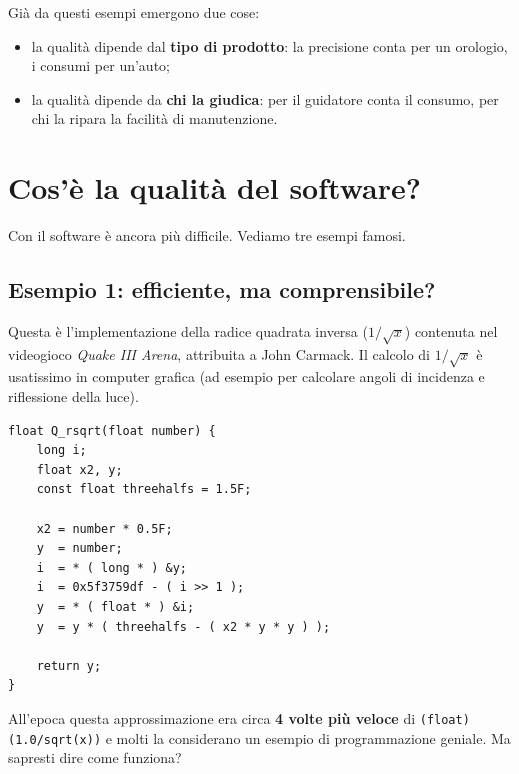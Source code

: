 Già da questi esempi emergono due cose:
\begin{itemize}
  \item la qualità dipende dal \textbf{tipo di prodotto}: la precisione conta per un orologio, i consumi per un'auto;
  \item la qualità dipende da \textbf{chi la giudica}: per il guidatore conta il consumo, per chi la ripara la facilità di manutenzione.
\end{itemize}

\section{Cos'è la qualità del software?}

Con il software è ancora più difficile. Vediamo tre esempi famosi.

\subsection{Esempio 1: efficiente, ma comprensibile?}

Questa è l'implementazione della radice quadrata inversa ($1/\sqrt{x}$) contenuta nel videogioco \textit{Quake III Arena},
attribuita a John Carmack. Il calcolo di $1/\sqrt{x}$ è usatissimo in computer grafica (ad esempio per calcolare angoli di
incidenza e riflessione della luce).

\begin{lstlisting}[style=c]
float Q_rsqrt(float number) {
    long i;
    float x2, y;
    const float threehalfs = 1.5F;

    x2 = number * 0.5F;
    y  = number;
    i  = * ( long * ) &y;
    i  = 0x5f3759df - ( i >> 1 );
    y  = * ( float * ) &i;
    y  = y * ( threehalfs - ( x2 * y * y ) );

    return y;
}
\end{lstlisting}

All'epoca questa approssimazione era circa \textbf{4 volte più veloce} di \texttt{(float)(1.0/sqrt(x))} e molti la considerano
un esempio di programmazione geniale. Ma sapresti dire come funziona?

